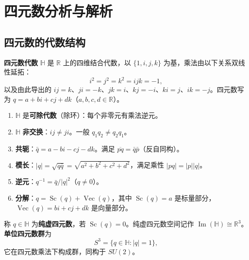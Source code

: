 \section{四元数分析与解析}\label{sec:quaternion_analysis}

\subsection{四元数的代数结构}

\begin{definition}[四元数代数]\label{def:quaternion_algebra}
\textbf{四元数代数} $\mathbb{H}$ 是 $\mathbb{R}$ 上的四维结合代数，以 $\{1, i, j, k\}$ 为基，乘法由以下关系双线性延拓：
\[
i^2 = j^2 = k^2 = ijk = -1,
\]
以及由此导出的 $ij = k$、$ji = -k$、$jk = i$、$kj = -i$、$ki = j$、$ik = -j$。四元数写为 $q = a + bi + cj + dk$（$a, b, c, d \in \mathbb{R}$）。
\end{definition}

\begin{property}[四元数的基本代数性质]\label{prop:quaternion_basic_props}
\begin{enumerate}[label=(\roman*)]
    \item $\mathbb{H}$ 是\textbf{可除代数}（除环）：每个非零元有乘法逆元。
    \item $\mathbb{H}$ \textbf{非交换}：$ij \neq ji$。一般 $q_1 q_2 \neq q_2 q_1$。
    \item \textbf{共轭}：$\bar q = a - bi - cj - dk$。满足 $\overline{pq} = \bar q \bar p$（反自同构）。
    \item \textbf{模长}：$|q| = \sqrt{q\bar q} = \sqrt{a^2 + b^2 + c^2 + d^2}$，满足乘性 $|pq| = |p||q|$。
    \item \textbf{逆元}：$q^{-1} = \bar q/|q|^2$（$q \ne 0$）。
    \item \textbf{分解}：$q = \operatorname{Sc}(q) + \operatorname{Vec}(q)$，其中 $\operatorname{Sc}(q) = a$ 是标量部分，$\operatorname{Vec}(q) = bi + cj + dk$ 是向量部分。
\end{enumerate}
\end{property}

\begin{definition}[纯虚四元数与单位球面]\label{def:pure_imaginary}
称 $q \in \mathbb{H}$ 为\textbf{纯虚四元数}，若 $\operatorname{Sc}(q) = 0$。纯虚四元数空间记作 $\operatorname{Im}(\mathbb{H}) \cong \mathbb{R}^3$。\textbf{单位四元数群}为
\[
S^3 = \{q \in \mathbb{H} : |q| = 1\},
\]
它在四元数乘法下构成群，同构于 $SU(2)$。
\end{definition}

